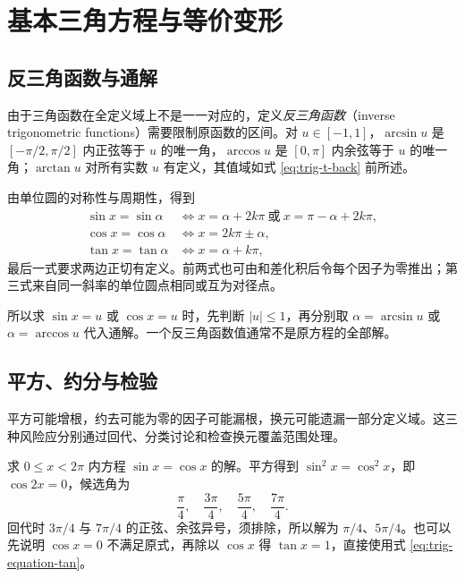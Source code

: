 \documentclass[UTF8,12pt,a4paper,fontset=fandol]{ctexart}
\begin{document}
\section{基本三角方程与等价变形}
\label{sec:trig-equations}

\subsection{反三角函数与通解}

由于三角函数在全定义域上不是一一对应的，定义\emph{反三角函数}（inverse trigonometric functions）需要限制原函数的区间。对 $u\in[-1,1]$，$\arcsin u$ 是 $[-\pi/2,\pi/2]$ 内正弦等于 $u$ 的唯一角，$\arccos u$ 是 $[0,\pi]$ 内余弦等于 $u$ 的唯一角；$\arctan u$ 对所有实数 $u$ 有定义，其值域如式 \eqref{eq:trig-t-back} 前所述。

由单位圆的对称性与周期性，得到
\begin{align}
  \sin x=\sin\alpha
  &\Longleftrightarrow x=\alpha+2k\pi\ \text{或}\ x=\pi-\alpha+2k\pi,
  \label{eq:trig-equation-sin}\\
  \cos x=\cos\alpha
  &\Longleftrightarrow x=2k\pi\pm\alpha,
  \label{eq:trig-equation-cos}\\
  \tan x=\tan\alpha
  &\Longleftrightarrow x=\alpha+k\pi,
  \label{eq:trig-equation-tan}
\end{align}
最后一式要求两边正切有定义。前两式也可由和差化积后令每个因子为零推出；第三式来自同一斜率的单位圆点相同或互为对径点。

所以求 $\sin x=u$ 或 $\cos x=u$ 时，先判断 $|u|\le1$，再分别取 $\alpha=\arcsin u$ 或 $\alpha=\arccos u$ 代入通解。一个反三角函数值通常不是原方程的全部解。

\subsection{平方、约分与检验}

平方可能增根，约去可能为零的因子可能漏根，换元可能遗漏一部分定义域。这三种风险应分别通过回代、分类讨论和检查换元覆盖范围处理。

\begin{example}[平方产生的额外候选解]
求 $0\le x<2\pi$ 内方程 $\sin x=\cos x$ 的解。平方得到 $\sin^2x=\cos^2x$，即 $\cos2x=0$，候选角为
\[
  \frac\pi4,\quad\frac{3\pi}4,\quad\frac{5\pi}4,\quad\frac{7\pi}4.
\]
回代时 $3\pi/4$ 与 $7\pi/4$ 的正弦、余弦异号，须排除，所以解为 $\pi/4$、$5\pi/4$。也可以先说明 $\cos x=0$ 不满足原式，再除以 $\cos x$ 得 $\tan x=1$，直接使用式 \eqref{eq:trig-equation-tan}。
\end{example}
\end{document}
